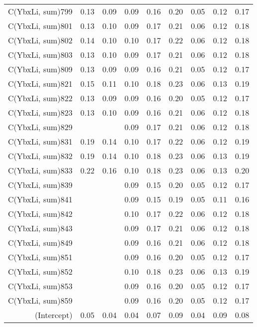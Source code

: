 \begin{table}[p]
\begin{tabular}{rrrrrrrrr}
  C(YbxLi, sum)799 & 0.13 & 0.09 & 0.09 & 0.16 & 0.20 & 0.05 & 0.12 & 0.17 \\ 
  C(YbxLi, sum)801 & 0.13 & 0.10 & 0.09 & 0.17 & 0.21 & 0.06 & 0.12 & 0.18 \\ 
  C(YbxLi, sum)802 & 0.14 & 0.10 & 0.10 & 0.17 & 0.22 & 0.06 & 0.12 & 0.18 \\ 
  C(YbxLi, sum)803 & 0.13 & 0.10 & 0.09 & 0.17 & 0.21 & 0.06 & 0.12 & 0.18 \\ 
  C(YbxLi, sum)809 & 0.13 & 0.09 & 0.09 & 0.16 & 0.21 & 0.05 & 0.12 & 0.17 \\ 
  C(YbxLi, sum)821 & 0.15 & 0.11 & 0.10 & 0.18 & 0.23 & 0.06 & 0.13 & 0.19 \\ 
  C(YbxLi, sum)822 & 0.13 & 0.09 & 0.09 & 0.16 & 0.20 & 0.05 & 0.12 & 0.17 \\ 
  C(YbxLi, sum)823 & 0.13 & 0.10 & 0.09 & 0.16 & 0.21 & 0.06 & 0.12 & 0.18 \\ 
  C(YbxLi, sum)829 &  &  & 0.09 & 0.17 & 0.21 & 0.06 & 0.12 & 0.18 \\ 
  C(YbxLi, sum)831 & 0.19 & 0.14 & 0.10 & 0.17 & 0.22 & 0.06 & 0.12 & 0.19 \\ 
  C(YbxLi, sum)832 & 0.19 & 0.14 & 0.10 & 0.18 & 0.23 & 0.06 & 0.13 & 0.19 \\ 
  C(YbxLi, sum)833 & 0.22 & 0.16 & 0.10 & 0.18 & 0.23 & 0.06 & 0.13 & 0.20 \\ 
  C(YbxLi, sum)839 &  &  & 0.09 & 0.15 & 0.20 & 0.05 & 0.12 & 0.17 \\ 
  C(YbxLi, sum)841 &  &  & 0.09 & 0.15 & 0.19 & 0.05 & 0.11 & 0.16 \\ 
  C(YbxLi, sum)842 &  &  & 0.10 & 0.17 & 0.22 & 0.06 & 0.12 & 0.18 \\ 
  C(YbxLi, sum)843 &  &  & 0.09 & 0.17 & 0.21 & 0.06 & 0.12 & 0.18 \\ 
  C(YbxLi, sum)849 &  &  & 0.09 & 0.16 & 0.21 & 0.06 & 0.12 & 0.18 \\ 
  C(YbxLi, sum)851 &  &  & 0.09 & 0.16 & 0.20 & 0.05 & 0.12 & 0.17 \\ 
  C(YbxLi, sum)852 &  &  & 0.10 & 0.18 & 0.23 & 0.06 & 0.13 & 0.19 \\ 
  C(YbxLi, sum)853 &  &  & 0.09 & 0.16 & 0.20 & 0.05 & 0.12 & 0.17 \\ 
  C(YbxLi, sum)859 &  &  & 0.09 & 0.16 & 0.20 & 0.05 & 0.12 & 0.17 \\ 
  (Intercept) & 0.05 & 0.04 & 0.04 & 0.07 & 0.09 & 0.04 & 0.09 & 0.08 \\ 
   \hline
\end{tabular}
\end{table}
